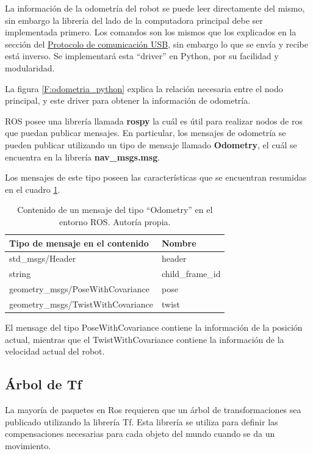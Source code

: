 \label{seccionodometria}

La información de la odometría del robot se puede leer directamente del mismo, sin embargo la librería del lado de la computadora principal debe ser implementada primero. Los comandos son los mismos que los explicados en la sección del \hyperref[libreria]{Protocolo de comunicación USB}, sin embargo lo que se envía y recibe está inverso. Se implementará esta ``driver'' en Python, por su facilidad y modularidad.

La figura \ref{F:odometria_python} explica la relación necesaria entre el nodo principal, y este driver para obtener la información de odometría.

ROS posee una librería llamada \textbf{rospy} la cuál es útil para realizar nodos de ros que puedan publicar mensajes. En particular, los mensajes de odometría se pueden publicar utilizando un tipo de mensaje llamado \textbf{Odometry}, el cuál se encuentra en la librería \textbf{nav\_msgs.msg}.

Los mensajes de este tipo poseen las características que se encuentran resumidas en el cuadro \ref{T:odometría}.

\begin{table}[H]
\caption{Contenido de un mensaje del tipo ``Odometry'' en el entorno ROS. Autoría propia.}
\begin{tabular}{|l|l|}
\hline
Tipo de mensaje en el contenido    & Nombre           \\ \hline
std\_msgs/Header                   & header           \\ \hline
string                             & child\_frame\_id \\ \hline
geometry\_msgs/PoseWithCovariance  & pose             \\ \hline
geometry\_msgs/TwistWithCovariance & twist            \\ \hline
\end{tabular}
\label{T:odometría}
\end{table}

El mensage del tipo PoseWithCovariance contiene la información de la posición actual, mientras que el TwistWithCovariance contiene la información de la velocidad actual del robot.

\subsection{Árbol de Tf}

La mayoría de paquetes en Ros requieren que un árbol de transformaciones sea publicado utilizando la librería Tf. Esta librería se utiliza para definir las compensaciones necesarias para cada objeto del mundo cuando se da un movimiento.

